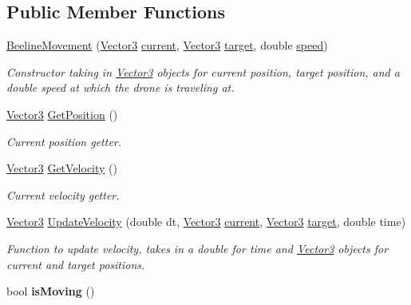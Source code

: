\subsection*{Public Member Functions}
\begin{DoxyCompactItemize}
\item 
\mbox{\label{classBeelineMovement_abebb0d5ff296ed7498b43438fffaddc3}} 
\hyperlink{classBeelineMovement_abebb0d5ff296ed7498b43438fffaddc3}{Beeline\+Movement} (\hyperlink{classVector3}{Vector3} \hyperlink{classBeelineMovement_a78e1e59186f4e2082365c3d9816f96c5}{current}, \hyperlink{classVector3}{Vector3} \hyperlink{classBeelineMovement_a49239eec9d469db2fb34b4268a97da6e}{target}, double \hyperlink{classBeelineMovement_a580f1c87f104f067fb1ad09dbe3a83af}{speed})
\begin{DoxyCompactList}\small\item\em Constructor taking in \hyperlink{classVector3}{Vector3} objects for current position, target position, and a double speed at which the drone is traveling at. \end{DoxyCompactList}\item 
\hyperlink{classVector3}{Vector3} \hyperlink{classBeelineMovement_abfe070233bcdba668cd6f445b149f310}{Get\+Position} ()
\begin{DoxyCompactList}\small\item\em Current position getter. \end{DoxyCompactList}\item 
\hyperlink{classVector3}{Vector3} \hyperlink{classBeelineMovement_a20adc01dabe57edd17128b81ec49661a}{Get\+Velocity} ()
\begin{DoxyCompactList}\small\item\em Current velocity getter. \end{DoxyCompactList}\item 
\hyperlink{classVector3}{Vector3} \hyperlink{classBeelineMovement_a6fd4a3d6f7be2cb6dfe623ce40fc55c4}{Update\+Velocity} (double dt, \hyperlink{classVector3}{Vector3} \hyperlink{classBeelineMovement_a78e1e59186f4e2082365c3d9816f96c5}{current}, \hyperlink{classVector3}{Vector3} \hyperlink{classBeelineMovement_a49239eec9d469db2fb34b4268a97da6e}{target}, double time)
\begin{DoxyCompactList}\small\item\em Function to update velocity, takes in a double for time and \hyperlink{classVector3}{Vector3} objects for current and target positions. \end{DoxyCompactList}\item 
\mbox{\label{classBeelineMovement_a9f2f68a5122dd168827843801cb932db}} 
bool {\bfseries is\+Moving} ()
\end{DoxyCompactItemize}
